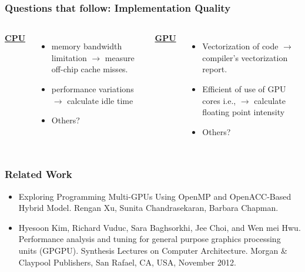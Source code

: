 \begin{frame}[label=impqual]
\frametitle{Questions that follow: Implementation Quality} 
\begin{columns} 
\underline{\textbf{CPU }}
\begin{itemize} 
\small \item \small memory bandwidth limitation $\rightarrow$ measure
off-chip cache misses.
\item \small performance variations $\rightarrow$ calculate idle time 
\item \small Others?
\end{itemize}

\underline{\textbf{GPU } } 
\begin{itemize} 
\small \item \small Vectorization of code $\rightarrow$ compiler's vectorization report.
\item \small Efficient of use of GPU cores i.e.,  $\rightarrow$ calculate floating point intensity 
\item \small Others? 
\end{itemize} 
\end{columns} 
\end{frame} 

\begin{frame}[label=relatedWork]
\frametitle{Related Work} 
\begin{itemize} 

\small \item \small Exploring Programming Multi-GPUs Using OpenMP and OpenACC-Based Hybrid Model. Rengan Xu, Sunita Chandrasekaran, Barbara Chapman. 
\item \small Hyesoon Kim, Richard Vuduc, Sara Baghsorkhi, Jee Choi,
  and Wen mei Hwu. Performance analysis and tuning for general purpose graphics processing units (GPGPU). Synthesis Lectures on Computer Architecture. Morgan \& Claypool Publishers, San Rafael, CA, USA, November 2012.
\end{itemize}
\end{frame} 


